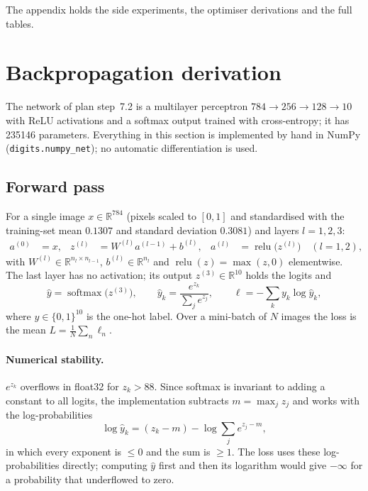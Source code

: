\documentclass[11pt,a4paper]{article}
\newcommand{\R}{\mathbb{R}}
\newcommand{\1}{\mathbf{1}}
\begin{document}
The appendix holds the side experiments, the optimiser derivations and the full tables.

\section{Backpropagation derivation}
\label{sec:backprop}

The network of plan step~7.2 is a multilayer perceptron $784 \to 256 \to 128 \to 10$ with ReLU
activations and a softmax output trained with cross-entropy; it has \num{235146} parameters.
Everything in this section is implemented by hand in NumPy (\texttt{digits.numpy\_net}); no
automatic differentiation is used.

\subsection{Forward pass}
For a single image $x \in \R^{784}$ (pixels scaled to $[0,1]$ and standardised with the
training-set mean $0.1307$ and standard deviation $0.3081$) and layers $l = 1, 2, 3$:
\begin{align}
  a^{(0)} &= x, &
  z^{(l)} &= W^{(l)} a^{(l-1)} + b^{(l)}, &
  a^{(l)} &= \operatorname{relu}\bigl(z^{(l)}\bigr) \quad (l = 1, 2),
\end{align}
with $W^{(l)} \in \R^{n_l \times n_{l-1}}$, $b^{(l)} \in \R^{n_l}$ and
$\operatorname{relu}(z) = \max(z, 0)$ elementwise. The last layer has no activation; its output
$z^{(3)} \in \R^{10}$ holds the logits and
\begin{equation}
  \hat y = \operatorname{softmax}\bigl(z^{(3)}\bigr), \qquad
  \hat y_k = \frac{e^{z_k}}{\sum_{j} e^{z_j}}, \qquad
  \ell = -\sum_{k} y_k \log \hat y_k ,
\end{equation}
where $y \in \{0,1\}^{10}$ is the one-hot label. Over a mini-batch of $N$ images the loss is the
mean $L = \frac1N \sum_{n} \ell_n$.

\paragraph{Numerical stability.} $e^{z_k}$ overflows in float32 for $z_k > 88$. Since softmax is
invariant to adding a constant to all logits, the implementation subtracts $m = \max_j z_j$ and
works with the log-probabilities
\begin{equation}
  \log \hat y_k = (z_k - m) - \log \sum_j e^{z_j - m},
\end{equation}
in which every exponent is $\le 0$ and the sum is $\ge 1$. The loss uses these
log-probabilities directly; computing $\hat y$ first and then its logarithm would give
$-\infty$ for a probability that underflowed to zero.
\end{document}
